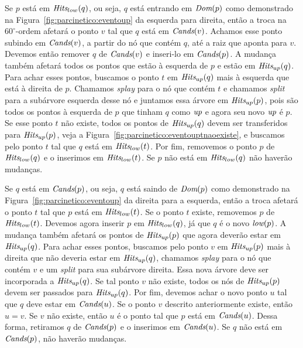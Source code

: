 Se $p$ está em $\textit{Hits}_{low}(q)$, ou seja, $q$ está entrando em $\textit{Dom}(p)$ como demonstrado na
Figura~\ref{fig:parcinetico:eventoup} da esquerda para direita, então a troca na $60^\circ$-ordem
afetará o ponto $v$ tal que $q$ está em $\textit{Cands}(v)$.
Achamos esse ponto subindo em $\textit{Cands}(v)$, a partir do nó que contém $q$, até a raiz que aponta
para $v$.
Devemos então remover $q$ de $\textit{Cands}(v)$ e inseri-lo em $\textit{Cands}(p)$.
A mudança também afetará todos os pontos que estão à esquerda de $p$ e estão em $\textit{Hits}_{up}(q)$.
Para achar esses pontos, buscamos o ponto $t$ em $\textit{Hits}_{up}(q)$ mais à esquerda que está à
direita de $p$.
Chamamos \textit{splay} para o nó que contém $t$ e chamamos \textit{split} para a subárvore
esquerda desse nó e juntamos essa árvore em $\textit{Hits}_{up}(p)$, pois são todos os pontos à esquerda
de $p$ que tinham $q$ como $\textit{up}$ e agora seu novo $\textit{up}$ é $p$.
Se esse ponto $t$ não existe, todos os pontos de $\textit{Hits}_{up}(q)$ devem ser transferidos para
$\textit{Hits}_{up}(p)$, veja a Figura~\ref{fig:parcinetico:eventouptnaoexiste}, e buscamos pelo ponto $t$
tal que $q$ está em $\textit{Hits}_{low}(t)$.
Por fim, removemos o ponto $p$ de $\textit{Hits}_{low}(q)$ e o inserimos em $\textit{Hits}_{low}(t)$.
Se $p$ não está em $\textit{Hits}_{low}(q)$ não haverão mudanças.

Se $q$ está em $\textit{Cands}(p)$, ou seja, $q$ está saindo de $\textit{Dom}(p)$ como demonstrado na
Figura~\ref{fig:parcinetico:eventoup} da direita para a esquerda, então a troca afetará o ponto $t$
tal que $p$ está em $\textit{Hits}_{low}(t)$.
Se o ponto $t$ existe, removemos $p$ de $\textit{Hits}_{low}(t)$.
Devemos agora inserir $p$ em $\textit{Hits}_{low}(q)$, já que $q$ é o novo $\textit{low}(p)$.
A mudança também afetará os pontos de $\textit{Hits}_{up}(p)$ que agora deverão estar em $\textit{Hits}_{up}(q)$.
Para achar esses pontos, buscamos pelo ponto $v$ em $\textit{Hits}_{up}(p)$ mais à direita que não deveria
estar em $\textit{Hits}_{up}(q)$, chamamos \textit{splay} para o nó que contém $v$ e um \textit{split}
para sua subárvore direita.
Essa nova árvore deve ser incorporada a $\textit{Hits}_{up}(q)$.
Se tal ponto $v$ não existe, todos os nós de $\textit{Hits}_{up}(p)$ devem ser passados para $\textit{Hits}_{up}
(q)$.
Por fim, devemos achar o novo ponto $u$ tal que $q$ deve estar em $\textit{Cands}(u)$.
Se o ponto $v$ descrito anteriormente existe, então $u = v$.
Se $v$ não existe, então $u$ é o ponto tal que $p$ está em $\textit{Cands}(u)$.
Dessa forma, retiramos $q$ de $\textit{Cands}(p)$ e o inserimos em $\textit{Cands}(u)$.
Se $q$ não está em $\textit{Cands}(p)$, não haverão mudanças.



